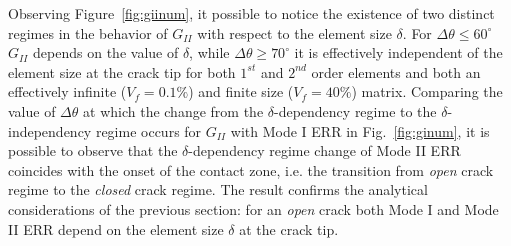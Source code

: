 \documentclass[review]{elsarticle}
\begin{document}
Observing Figure~\ref{fig:giinum}, it possible to notice the existence of two distinct regimes in the behavior of $G_{II}$ with respect to the element size $\delta$. For $\Delta\theta\leq60^{\circ}$ $G_{II}$ depends on the value of $\delta$, while $\Delta\theta\geq70^{\circ}$ it is effectively independent of the element size at the crack tip for both $1^{st}$ and $2^{nd}$ order elements and both an effectively infinite ($V_{f}=0.1\%$) and finite size ($V_{f}=40\%$) matrix. Comparing the value of $\Delta\theta$ at which the change from the $\delta$-dependency regime to the $\delta$-independency regime occurs for $G_{II}$ with Mode I ERR in Fig.~\ref{fig:ginum}, it is possible to observe that the $\delta$-dependency regime change of Mode II ERR coincides with the onset of the contact zone, i.e. the transition from \emph{open} crack regime to the \emph{closed} crack regime. The result confirms the analytical considerations of the previous section: for an \emph{open} crack both Mode I and Mode II ERR depend on the element size $\delta$ at the crack tip.
\end{document}
